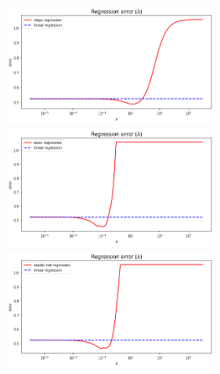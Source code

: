 \begin{frame}
\centering
\includegraphics[width=7cm,height=4cm, left]{Img/data_ridge_vs_lambda.png}
\includegraphics[width=7cm,height=4cm, right]{Img/data_lasso_vs_lambda.png}\\
\centering
\includegraphics[width=7cm,height=4cm, center]{Img/data_elnet_vs_lambda.png}\\
\end{frame}


